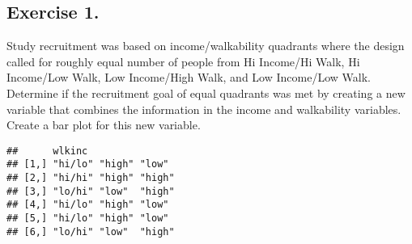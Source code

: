 \documentclass[]{article}
\newenvironment{Shaded}{\begin{snugshade}}{\end{snugshade}}
\newcommand{\KeywordTok}[1]{\textcolor[rgb]{0.13,0.29,0.53}{\textbf{#1}}}
\newcommand{\StringTok}[1]{\textcolor[rgb]{0.31,0.60,0.02}{#1}}
\newcommand{\OperatorTok}[1]{\textcolor[rgb]{0.81,0.36,0.00}{\textbf{#1}}}
\newcommand{\NormalTok}[1]{#1}
\begin{document}
\subsection{Exercise 1.}\label{exercise-1.}

Study recruitment was based on income/walkability quadrants where the
design called for roughly equal number of people from Hi Income/Hi Walk,
Hi Income/Low Walk, Low Income/High Walk, and Low Income/Low Walk.
Determine if the recruitment goal of equal quadrants was met by creating
a new variable that combines the information in the income and
walkability variables. Create a bar plot for this new variable.

\begin{Shaded}
\end{Shaded}

\begin{verbatim}
##      wlkinc               
## [1,] "hi/lo" "high" "low" 
## [2,] "hi/hi" "high" "high"
## [3,] "lo/hi" "low"  "high"
## [4,] "hi/lo" "high" "low" 
## [5,] "hi/lo" "high" "low" 
## [6,] "lo/hi" "low"  "high"
\end{verbatim}
\end{document}
